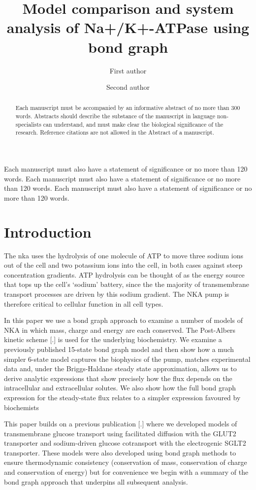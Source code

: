 \documentclass{biophys-new}
\title{Model comparison and system analysis of Na+/K+-ATPase using bond graph}
\author[1,*]{First author}
\author[2]{Second author}
\affil[1]{Institution A, Address A}
\affil[2]{Institution B, Address B}
\begin{document}
\begin{frontmatter}

\begin{abstract}
Each manuscript must be accompanied by an informative abstract of no more than 300 words. Abstracts should describe the substance of the manuscript in language non-specialists can understand, and must make clear the biological significance of the research. Reference citations are not allowed in the Abstract of a manuscript. 
\end{abstract}

\begin{sigstatement}
Each manuscript must also have a statement of significance or no more than 120 words. Each manuscript must also have a statement of significance or no more than 120 words. Each manuscript must also have a statement of significance or no more than 120 words.
\end{sigstatement}
\end{frontmatter}

\section*{Introduction}

The \gls{nka} uses the hydrolysis of one molecule of ATP to move three sodium ions out of the cell and two potassium ions into the cell,
in both cases against steep concentration gradients. ATP hydrolysis can be thought of as the energy source that tops up the cell's `sodium' battery,
since the the majority of transmembrane transport processes are driven by this sodium gradient.
The NKA pump is therefore critical to cellular function in all cell types.

In this paper we use a bond graph approach to examine a number of models of NKA in which mass, charge and energy are each conserved.
The Post-Albers kinetic scheme {[}.{]} is used for the underlying biochemistry.
We examine a previously published 15-state bond graph
model and then show how a much simpler 6-state model captures the
biophysics of the pump, matches experimental data and, under the
Briggs-Haldane steady state approximation, allows us to derive analytic
expressions that show precisely how the flux depends on the
intracellular and extracellular solutes. We also show how the full bond
graph expression for the steady-state flux relates to a simpler
expression favoured by biochemists

This paper builds on a previous publication {[}.{]} where we developed
models of transmembrane glucose transport using facilitated diffusion
with the GLUT2 transporter and sodium-driven glucose cotransport with
the electrogenic SGLT2 transporter. These models were also developed
using bond graph methods to ensure thermodynamic consistency
(conservation of mass, conservation of charge and conservation of
energy) but for convenience we begin with a summary of the bond graph
approach that underpins all subsequent analysis.
\end{document}
